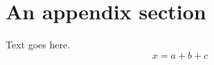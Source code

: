\section{An appendix section}
    Text goes here.
    \begin{equation}
    x=a+b+c
    \end{equation}
